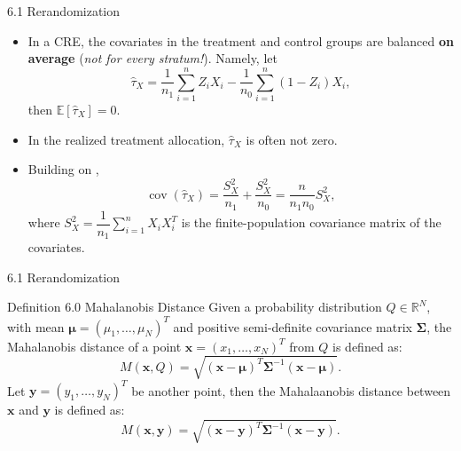 \documentclass[aspectratio=169, 12pt]{beamer}
\begin{document}
\begin{frame}[label=neymanian_cov]{6.1 Rerandomization}
  \begin{itemize}
    \item In a CRE, the covariates in the treatment and control groups are balanced \textbf{on average} (\textit{not for every stratum!}). Namely, let
    \[
    \widehat{\tau}_X = \frac{1}{n_1}\sum_{i=1}^{n}Z_iX_i-\frac{1}{n_0}\sum_{i=1}^{n}(1-Z_i)X_i,
    \]
    then $\mathbb{E}[\widehat{\tau}_X]=0$.
    \item In the realized treatment allocation, $\widehat{\tau}_X$ is often not zero.
    \item Building on \citet{neyman1923application}, 
    \begin{equation}
    \operatorname{cov}(\widehat{\tau}_X) = \frac{S_X^2}{n_1}+ \frac{S_X^2}{n_0} = \frac{n}{n_1n_0}S_X^2,
    \label{eq:neymanian_cov}
    \end{equation}
    where $S_X^2=\dfrac{1}{n_1}\sum_{i=1}^{n}X_iX_i^T$ is the finite-population covariance matrix of the covariates.
    \vfill
    \hfill\hyperlink{pr-neymanian_cov<1>}{}
  \end{itemize}
\end{frame}

\begin{frame}{6.1 Rerandomization}
  \begin{keybox}{Definition 6.0 Mahalanobis Distance}
  Given a probability distribution $Q\in \mathbb{R}^N$, with mean $\bm{\mu}=(\mu_1,\dots,\mu_N)^T$ and positive semi-definite covariance matrix $\bm{\Sigma}$, the Mahalanobis distance of a point $\bm{x}=(x_1,\dots,x_N)^T$ from $Q$ is defined as:
  \[
  M(\bm{x},Q) 
  = \sqrt{(\bm{x}-\bm{\mu})^T\bm{\Sigma}^{-1}(\bm{x}-\bm{\mu})}.
  \]
  Let $\bm{y}=(y_1,\dots,y_N)^T$ be another point, then the Mahalaanobis distance between $\bm{x}$ and $\bm{y}$ is defined as:
  \[
  M(\bm{x},\bm{y}) 
  = \sqrt{(\bm{x}-\bm{y})^T\bm{\Sigma}^{-1}(\bm{x}-\bm{y})}.
  \]
  \label{def:mahalanobis}
  \end{keybox}
\end{frame}
\end{document}
